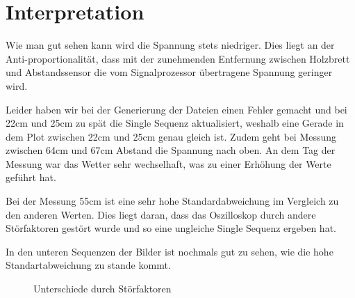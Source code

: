 \documentclass[12pt, oneside, a4paper, \docLanguage]{report}
\begin{document}
\section{Interpretation}
\label{chap:VERSUCH_1_INTERPRETATION}
Wie man gut sehen kann wird die Spannung stets niedriger. Dies liegt an der Anti-proportionalität, dass mit der zunehmenden Entfernung zwischen Holzbrett und Abstandssensor die vom Signalprozessor übertragene Spannung geringer wird.

Leider haben wir bei der Generierung der Dateien einen Fehler gemacht und bei 22cm und 25cm zu spät die Single Sequenz aktualisiert, weshalb eine Gerade in dem Plot zwischen 22cm und 25cm genau gleich ist.
Zudem geht bei Messung zwischen 64cm und 67cm Abstand die Spannung nach oben. An dem Tag der Messung war das Wetter sehr wechselhaft, was zu einer Erhöhung der Werte geführt hat.

Bei der Messung 55cm ist eine sehr hohe Standardabweichung im Vergleich zu den anderen Werten. Dies liegt daran, dass das Oszilloskop durch andere Störfaktoren gestört wurde und so eine ungleiche Single Sequenz ergeben hat.

In den unteren Sequenzen der Bilder ist nochmals gut zu sehen, wie die hohe Standartabweichung zu stande kommt.


\begin{figure}
  	\centering
  	\hfill
	\caption{Unterschiede durch Störfaktoren}
\end{figure}
\end{document}
